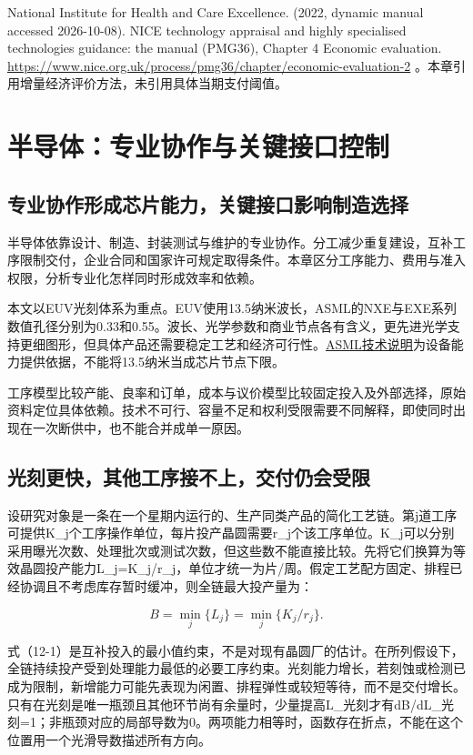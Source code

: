 \documentclass[UTF8,fontset=windows,12pt,a4paper,oneside,openany]{ctexbook}
\begin{document}
National Institute for Health and Care Excellence. (2022, dynamic manual accessed 2026-10-08). NICE technology appraisal and highly specialised technologies guidance: the manual (PMG36), Chapter 4 Economic evaluation. \url{https://www.nice.org.uk/process/pmg36/chapter/economic-evaluation-2} 。本章引用增量经济评价方法，未引用具体当期支付阈值。

\chapter{半导体：专业协作与关键接口控制}\label{ch:12}

\section{专业协作形成芯片能力，关键接口影响制造选择}

半导体依靠设计、制造、封装测试与维护的专业协作。分工减少重复建设，互补工序限制交付，企业合同和国家许可规定取得条件。本章区分工序能力、费用与准入权限，分析专业化怎样同时形成效率和依赖。

本文以EUV光刻体系为重点。EUV使用13.5纳米波长，ASML的NXE与EXE系列数值孔径分别为0.33和0.55。波长、光学参数和商业节点各有含义，更先进光学支持更细图形，但具体产品还需要稳定工艺和经济可行性。\href{https://www.asml.com/en/products/euv-lithography-systems}{ASML技术说明}为设备能力提供依据，不能将13.5纳米当成芯片节点下限。

工序模型比较产能、良率和订单，成本与议价模型比较固定投入及外部选择，原始资料定位具体依赖。技术不可行、容量不足和权利受限需要不同解释，即使同时出现在一次断供中，也不能合并成单一原因。

\section{光刻更快，其他工序接不上，交付仍会受限}

设研究对象是一条在一个星期内运行的、生产同类产品的简化工艺链。第j道工序可提供K\_j个工序操作单位，每片投产晶圆需要r\_j个该工序单位。K\_j可以分别采用曝光次数、处理批次或测试次数，但这些数不能直接比较。先将它们换算为等效晶圆投产能力L\_j=K\_j/r\_j，单位才统一为片/周。假定工艺配方固定、排程已经协调且不考虑库存暂时缓冲，则全链最大投产量为：

\[
B=\min_j\{L_j\}=\min_j\{K_j/r_j\}.\tag{12-1}
\]

式（12-1）是互补投入的最小值约束，不是对现有晶圆厂的估计。在所列假设下，全链持续投产受到处理能力最低的必要工序约束。光刻能力增长，若刻蚀或检测已成为限制，新增能力可能先表现为闲置、排程弹性或较短等待，而不是交付增长。只有在光刻是唯一瓶颈且其他环节尚有余量时，少量提高L\_光刻才有dB/dL\_光刻=1；非瓶颈对应的局部导数为0。两项能力相等时，函数存在折点，不能在这个位置用一个光滑导数描述所有方向。
\end{document}
